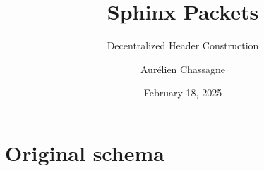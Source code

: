 \documentclass[aspectratio=1610]{beamer}
\title{Sphinx Packets}
\subtitle{Decentralized Header Construction}
\author{Aurélien Chassagne}
\date{February 18, 2025} %
\begin{document}
\begin{frame}
\titlepage
\end{frame}


\scriptsize
\section{Original schema}





\end{document}
